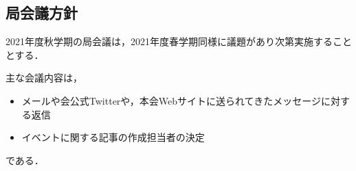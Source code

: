 \subsection*{局会議方針}


2021年度秋学期の局会議は，2021年度春学期同様に議題があり次第実施することとする．

主な会議内容は，
\begin{itemize}
    \item メールや会公式Twitterや，本会Webサイトに送られてきたメッセージに対する返信
    \item イベントに関する記事の作成担当者の決定
\end{itemize}
である．